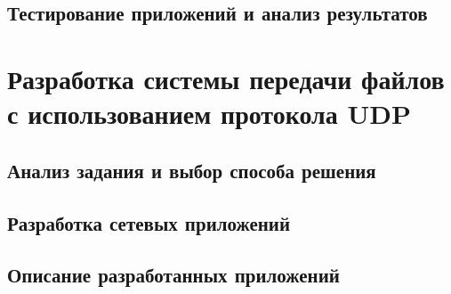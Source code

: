 
\subsection{Тестирование приложений и анализ результатов}


\section{Разработка системы передачи файлов с использованием протокола UDP}

\subsection{Анализ задания и выбор способа решения}


\subsection{Разработка сетевых приложений}


\subsection{Описание разработанных приложений}


